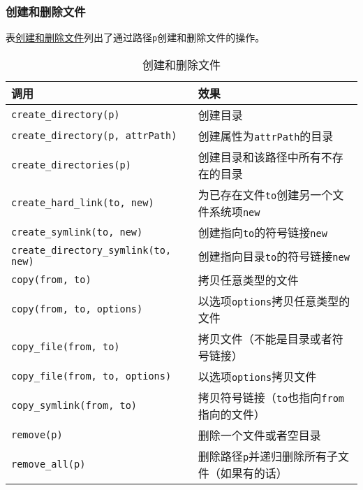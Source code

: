 \subsubsection{创建和删除文件}
表\hyperref[t20.15]{创建和删除文件}列出了通过路径\texttt{p}创建和删除文件的操作。
\begin{table}[htb]
    \centering
    \begin{tabular}{l|l}
        \hline
        \textbf{调用}                                  & \textbf{效果}                              \\
        \hline
        \texttt{create\_directory(p)}                & 创建目录                                     \\
        \texttt{create\_directory(p, attrPath)}      & 创建属性为\texttt{attrPath}的目录                \\
        \texttt{create\_directories(p)}              & 创建目录和该路径中所有不存在的目录                        \\
        \texttt{create\_hard\_link(to, new)}         & 为已存在文件\texttt{to}创建另一个文件系统项\texttt{new}  \\
        \texttt{create\_symlink(to, new)}            & 创建指向\texttt{to}的符号链接\texttt{new}         \\
        \texttt{create\_directory\_symlink(to, new)} & 创建指向目录\texttt{to}的符号链接\texttt{new}       \\
        \texttt{copy(from, to)}                      & 拷贝任意类型的文件                                \\
        \texttt{copy(from, to, options)}             & 以选项\texttt{options}拷贝任意类型的文件             \\
        \texttt{copy\_file(from, to)}                & 拷贝文件（不能是目录或者符号链接）                        \\
        \texttt{copy\_file(from, to, options)}       & 以选项\texttt{options}拷贝文件                  \\
        \texttt{copy\_symlink(from, to)}             & 拷贝符号链接（\texttt{to}也指向\texttt{from}指向的文件） \\
        \texttt{remove(p)}                           & 删除一个文件或者空目录                              \\
        \texttt{remove\_all(p)}                      & 删除路径\texttt{p}并递归删除所有子文件（如果有的话）          \\
        \hline
    \end{tabular}
    \caption{创建和删除文件}
    \label{t20.15}
\end{table}

